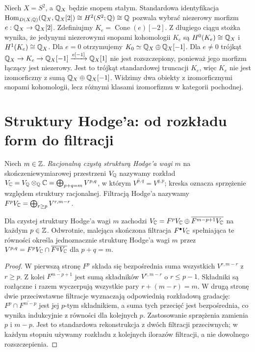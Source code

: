 \begin{przyklad}
\label{ex:derived-not-split-xiv}
Niech $X=S^2$, a $\mathbb{Q}_X$ będzie snopem stałym.
Standardowa identyfikacja
$\operatorname{Hom}_{D(X;\mathbb{Q})}(\mathbb{Q}_X,\mathbb{Q}_X[2])
\cong H^2(S^2;\mathbb{Q})\cong\mathbb{Q}$
pozwala wybrać niezerowy morfizm
$e:\mathbb{Q}_X\to\mathbb{Q}_X[2]$.
Zdefiniujmy $K_e=\operatorname{Cone}(e)[-2]$.
Z długiego ciągu stożka wynika, że jedynymi
niezerowymi snopami kohomologii $K_e$ są
$H^0(K_e)\cong\mathbb{Q}_X$ i $H^1(K_e)\cong\mathbb{Q}_X$.
Dla $e=0$ otrzymujemy
$K_0\simeq\mathbb{Q}_X\oplus\mathbb{Q}_X[-1]$.
Dla $e\ne0$ trójkąt
$\mathbb{Q}_X\to K_e\to\mathbb{Q}_X[-1]\xrightarrow{e[-1]}\mathbb{Q}_X[1]$
nie jest rozszczepiony, ponieważ jego morfizm łączący
jest niezerowy. Jest to trójkąt standardowej truncacji
$K_e$, więc $K_e$ nie jest izomorficzny z sumą
$\mathbb{Q}_X\oplus\mathbb{Q}_X[-1]$.
Widzimy dwa obiekty z izomorficznymi snopami
kohomologii, lecz różnymi klasami izomorfizmu
w kategorii pochodnej.
\end{przyklad}

\section{Struktury Hodge'a: od rozkładu form do filtracji}
\begin{definicja}
Niech $m\in\mathbb{Z}$. \emph{Racjonalną czystą strukturą
Hodge'a wagi $m$} na skończeniewymiarowej przestrzeni
$V_{\mathbb{Q}}$ nazywamy rozkład
$V_{\mathbb{C}}=V_{\mathbb{Q}}\otimes_{\mathbb{Q}}\mathbb{C}=\bigoplus_{p+q=m}V^{p,q}$,
w którym $\overline{V^{p,q}}=V^{q,p}$; kreska oznacza
sprzężenie względem struktury racjonalnej.
Filtracją Hodge'a nazywamy
$F^pV_{\mathbb{C}}=\bigoplus_{r\ge p}V^{r,m-r}$.
\end{definicja}
\begin{stwierdzenie}
\label{prop:hodge-filtration-xiv}
Dla czystej struktury Hodge'a wagi $m$ zachodzi
$V_{\mathbb{C}}=F^pV_{\mathbb{C}}\oplus\overline{F^{m-p+1}V_{\mathbb{C}}}$
na każdym $p\in\mathbb{Z}$. Odwrotnie, malejąca skończona
filtracja $F^\bullet V_{\mathbb{C}}$ spełniająca te równości
określa jednoznacznie strukturę Hodge'a wagi $m$ przez
$V^{p,q}=F^pV_{\mathbb{C}}\cap\overline{F^qV_{\mathbb{C}}}$
dla $p+q=m$.
\end{stwierdzenie}
\begin{proof}
W pierwszą stronę $F^p$ składa się bezpośrednia suma
wszystkich $V^{r,m-r}$ z $r\ge p$. Z kolei
$\overline{F^{m-p+1}}$ jest sumą składników
$V^{r,m-r}$ o $r\le p-1$. Składniki są rozłączne
i razem wyczerpują wszystkie pary $r+(m-r)=m$.
W drugą stronę dwie przeciwstawne filtracje
wyznaczają odpowiednią rozkładową gradację:
$F^p\cap\overline{F^{m-p}}$ jest jej $p$-tym składnikiem,
a suma tych przecięć jest bezpośrednia, co wynika
indukcyjnie z równości dla kolejnych $p$.
Zastosowanie sprzężenia zamienia $p$ i $m-p$.
Jest to standardowa rekonstrukcja z dwóch filtracji przeciwnych;
w każdym stopniu używamy rozkładu z kolejnych
ilorazów filtracji, a nie dowolnego rozszczepienia.
\end{proof}

